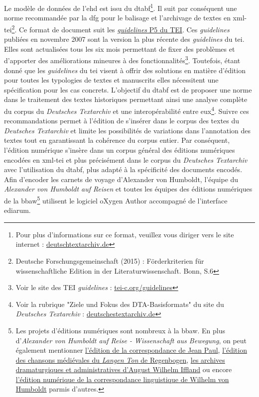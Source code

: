 \documentclass[a4paper, 12pt, twoside]{book}
\begin{document}
Le modèle de données de l'\gls{ehd} est issu du \gls{dtabf}\footnote{Pour plus d'informations sur ce format, veuillez vous diriger vers le site internet : \href{https://www.deutschestextarchiv.de/doku/basisformat/}{deutschtextarchiv.de}}. Il suit par conséquent une norme recommandée par la \gls{dfg} pour le balisage et l'archivage de textes en \gls{xml}-\gls{tei}\footnote{Deutsche Forschungsgemeinschaft (2015) : Förderkriterien für wissenschaftliche Edition in der Literaturwissenschaft. Bonn, S.6}. Ce format de document suit les \href{https://tei-c.org/guidelines/p5}{\textit{guidelines} P5 du TEI}. Ces \textit{guidelines} publiées en novembre 2007 sont la version la plus récente des \textit{guidelines} du \gls{tei}. Elles sont actualisées tous les six mois permettant de fixer des problèmes et d'apporter des améliorations mineures à des fonctionnalités\footnote{Voir le site des TEI \textit{guidelines} : \href{https://tei-c.org/guidelines/}{tei-c.org/guidelines}}. Toutefois, étant donné que les \textit{guidelines} du \gls{tei} visent à offrir des solutions en matière d'édition pour toutes les typologies de textes et manuscrits elles nécessitent une spécification pour les cas concrets. L'objectif du \gls{dtabf} est de proposer une norme dans le traitement des textes historiques permettant ainsi une analyse complète du corpus du \textit{Deutsches Textarchiv} et une interopérabilité entre eux\footnote{Voir la rubrique "Ziele und Fokus des DTA-Basisformats" du site du \textit{Deutsches Textarchiv} : \href{https://www.deutschestextarchiv.de/doku/basisformat/ziel.html}{deutschestextarchiv.de}}. Suivre ces recommandations permet à l'édition de s'insérer dans le corpus des textes du \textit{Deutsches Textarchiv} et limite les possibilités de variations dans l'annotation des textes tout en garantissant la cohérence du corpus entier. 
Par conséquent, l'édition numérique s'insère dans un corpus général des éditions numériques encodées en \gls{xml}-\gls{tei} et plus précisément dans le corpus du \textit{Deutsches Textarchiv} avec l'utilisation du \gls{dtabf}, plus adapté à la spécificité des documents encodés. Afin d'encoder les carnets de voyage d'Alexander von Humboldt, l'équipe du \textit{Alexander von Humboldt auf Reisen} et toutes les équipes des éditions numériques de la \gls{bbaw}\footnote{Les projets d'éditions numériques sont nombreux à la \gls{bbaw}. En plus d'\textit{Alexander von Humboldt auf Reise - Wissenschaft aus Bewegung}, on peut également mentionner \href{https://www.jeanpaul-edition.de/start.html}{l'édition de la correspondance de Jean Paul}, \href{https://www.uni-due.de/germanistik/mediae/aktuell.php}{l'édition des chansons médiévales du \textit{Langen Ton} de Regenbogen}, \href{https://iffland.bbaw.de/}{les archives dramaturgiques et administratives d'August Wilhelm Iffland} ou encore \href{https://wvh-briefe.bbaw.de/}{l'édition numérique de la correspondance linguistique de Wilhelm von Humboldt} parmis d'autres.} utilisent le logiciel oXygen Author accompagné de l'interface ediarum. 
\end{document}
